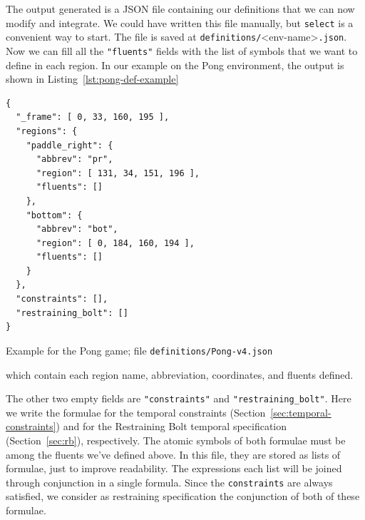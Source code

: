 The output generated is a JSON file containing our definitions that we can now
modify and integrate. We could have written this file manually, but
\texttt{select} is a convenient way to start. The file is saved at
\texttt{definitions/}<env-name>\texttt{.json}. Now we can fill all the
\verb|"fluents"| fields with the list of symbols that we want to define in
each region. In our example on the Pong environment, the output is shown in
Listing~\ref{lst:pong-def-example}
\begin{listing}
\begin{verbatim}
{
  "_frame": [ 0, 33, 160, 195 ],
  "regions": {
    "paddle_right": {
      "abbrev": "pr",
      "region": [ 131, 34, 151, 196 ],
      "fluents": []
    },
    "bottom": {
      "abbrev": "bot",
      "region": [ 0, 184, 160, 194 ],
      "fluents": []
    }
  },
  "constraints": [],
  "restraining_bolt": []
}
\end{verbatim}
\caption{Example for the Pong game; file \texttt{definitions/Pong-v4.json}}
\label{lst:pong-def-example}
\end{listing}
which contain each region name, abbreviation, coordinates, and fluents
defined. 

The other two empty fields are \verb|"constraints"| and
\verb|"restraining_bolt"|. Here we write the \ldl{} formulae for the temporal
constraints (Section~\ref{sec:temporal-constraints}) and for the Restraining
Bolt temporal specification (Section~\ref{sec:rb}), respectively. The atomic
symbols of both formulae must be among the fluents we've defined above. In
this file, they are stored as lists of formulae, just to improve readability.
The expressions each list will be joined through conjunction in a single
\ldl{} formula. Since the \texttt{constraints} are always satisfied, we
consider as restraining specification the conjunction of both of these
formulae.

